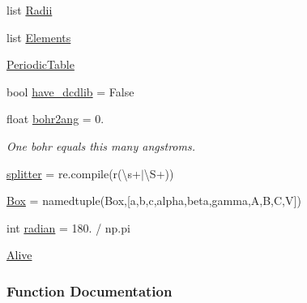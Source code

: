 \begin{DoxyCompactItemize}
\item 
list \hyperlink{namespacesrc_1_1molecule_ab6553bc53f79f232d164e967d5162157}{Radii}
\item 
list \hyperlink{namespacesrc_1_1molecule_a74a6a037671072655c4747c6d3c3173f}{Elements}
\item 
\hyperlink{namespacesrc_1_1molecule_a9104a499383cefd53789d767a08472b3}{Periodic\+Table}
\item 
bool \hyperlink{namespacesrc_1_1molecule_aab4fe1dc561e993a549fa87600b86c66}{have\+\_\+dcdlib} = False
\item 
float \hyperlink{namespacesrc_1_1molecule_a3bec96f13384a74f923dab3a5b499d31}{bohr2ang} = 0.
\begin{DoxyCompactList}\small\item\em One bohr equals this many angstroms. \end{DoxyCompactList}\item 
\hyperlink{namespacesrc_1_1molecule_a5e161d9ca62759362680a22c03493a92}{splitter} = re.\+compile(r\textquotesingle{}(\textbackslash{}s+$\vert$\textbackslash{}S+)\textquotesingle{})
\item 
\hyperlink{namespacesrc_1_1molecule_abfef1f072cfa93bc31e36985a976b65f}{Box} = namedtuple(\textquotesingle{}Box\textquotesingle{},\mbox{[}\textquotesingle{}a\textquotesingle{},\textquotesingle{}b\textquotesingle{},\textquotesingle{}c\textquotesingle{},\textquotesingle{}alpha\textquotesingle{},\textquotesingle{}beta\textquotesingle{},\textquotesingle{}gamma\textquotesingle{},\textquotesingle{}A\textquotesingle{},\textquotesingle{}B\textquotesingle{},\textquotesingle{}C\textquotesingle{},\textquotesingle{}V\textquotesingle{}\mbox{]})
\item 
int \hyperlink{namespacesrc_1_1molecule_a5a46092fd77c5b3b4cdbe06017ff9bd7}{radian} = 180. / np.\+pi
\item 
\hyperlink{namespacesrc_1_1molecule_a7ceb335632b1368c941413a9788cc047}{Alive}
\end{DoxyCompactItemize}


\subsubsection{Function Documentation}
\mbox{\label{namespacesrc_1_1molecule_a157c193873713c7029b653c1ca51eb7a}} 
